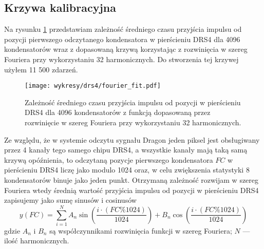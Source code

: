 \documentclass[a4paper,11pt,twoside]{article}
\begin{document}
\subsection{Krzywa kalibracyjna}
Na rysunku \ref{fig:fourier_fit_4096} przedstawiam zależność średniego czasu przyjścia impulsu od pozycji pierwszego odczytanego kondensatora w pierścieniu DRS4 dla 4096 kondensatorów wraz z dopasowaną krzywą korzystając z rozwinięcia w szereg Fouriera przy wykorzystaniu 32 harmonicznych. Do stworzenia tej krzywej użyłem 11 500 zdarzeń.
\begin{figure}[H] 
\centering
\texttt{[image: wykresy/drs4/fourier\_fit.pdf]}
\caption{Zależność średniego czasu przyjścia impulsu od pozycji w pierścieniu DRS4 dla 4096 kondensatorów z funkcją dopasowaną przez rozwinięcie w szereg Fouriera przy wykorzystaniu 32 harmonicznych.}
\label{fig:fourier_fit_4096}
\end{figure}
Ze względu, że w systemie odczytu sygnału Dragon jeden piksel jest obsługiwany przez 4 kanały tego samego chipu DRS4, a wszystkie kanały mają taką samą krzywą opóźnienia, to odczytaną pozycje pierwszego kondensatora $FC$ w pierścieniu DRS4 liczę jako modulo 1024 oraz, w celu zwiększenia statystyki 8 kondensatorów binuje jako jeden punkt. 
Otrzymaną zależność rozwijam w szereg Fouriera wtedy
średnią wartość przyjścia impulsu od pozycji w pierścieniu DRS4 zapisujemy jako sumę sinusów i cosinusów
\begin{equation}
y(FC) = \sum_{i=1}^{N} A_n \sin \left( \frac{ i \cdot (FC\%1024)  }{1024} \right) + B_n \cos \left( \frac{i \cdot (FC\%1024) }{1024} \right)
\end{equation}
gdzie $A_n$ i $B_n$ są współczynnikami rozwinięcia funkcji w szereg Fouriera; $N$ --- ilość harmonicznych.
\end{document}
